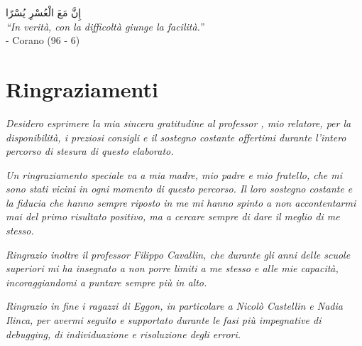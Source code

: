 \cleardoublepage
{}
{}

\begin{flushright}
    \textarabic{إِنَّ مَعَ الْعُسْرِ يُسْرًا}
    \\[0.3cm]
    \textit{``In verità, con la difficoltà giunge la facilità.''} \\
    \medskip
    - Corano (96 - 6)
\end{flushright}

\begingroup
\let\clearpage\relax
\let\cleardoublepage\relax
\let\cleardoublepage\relax

\chapter*{Ringraziamenti}

\textit{
Desidero esprimere la mia sincera gratitudine
al professor \myProf, mio relatore, per la disponibilità, i preziosi consigli e il sostegno
costante offertimi durante l'intero percorso di stesura di questo elaborato.}

\vspace{0.35cm}

\textit{
\noindent Un ringraziamento speciale va a mia madre, mio padre e mio fratello, che mi sono
stati vicini in ogni momento di questo percorso. Il loro sostegno costante e la fiducia che
hanno sempre riposto in me mi hanno spinto a non accontentarmi mai del primo risultato
positivo, ma a cercare sempre di dare il meglio di me stesso.}

\vspace{0.35cm}

\textit{
\noindent Ringrazio inoltre il professor Filippo Cavallin, che durante gli anni delle scuole
superiori mi ha insegnato a non porre limiti a me stesso e alle mie capacità, incoraggiandomi
a puntare sempre più in alto.}

\vspace{0.35cm}

\textit{
\noindent Ringrazio in fine i ragazzi di Eggon, in particolare a Nicolò Castellin
e Nadia Ilinca, per avermi seguito e supportato durante le fasi più impegnative di debugging, di individuazione
e risoluzione degli errori.}

\vspace{0.75cm}

\noindent{\textit{\myLocation, \myTime}}
\hfill \textit{\myName}

\endgroup